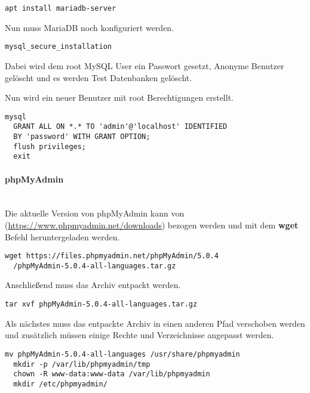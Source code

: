 \begin{lstlisting}[caption={MariadB installieren}, captionpos=b]
  apt install mariadb-server
\end{lstlisting}

Nun muss MariaDB noch konfiguriert werden.

\begin{lstlisting}[caption={MariaDB Secure Installation}, captionpos=b]
  mysql_secure_installation
\end{lstlisting}

Dabei wird dem root MySQL User ein Passwort gesetzt, Anonyme Benutzer gelöscht
und es werden Test Datenbanken gelöscht.

Nun wird ein neuer Benutzer mit root Berechtigungen erstellt.

\begin{lstlisting}[caption={MariaDB Secure Installation}, captionpos=b]
  mysql
  GRANT ALL ON *.* TO 'admin'@'localhost' IDENTIFIED 
  BY 'password' WITH GRANT OPTION;
  flush privileges;
  exit
\end{lstlisting}

\paragraph{phpMyAdmin}\mbox{}\\

Die aktuelle Version von phpMyAdmin kann von
(\url{https://www.phpmyadmin.net/downloads}) bezogen werden und mit dem
\textbf{wget} Befehl heruntergeladen werden.

\begin{lstlisting}[caption={phpMyAdmin Download}, captionpos=b]
  wget https://files.phpmyadmin.net/phpMyAdmin/5.0.4
  /phpMyAdmin-5.0.4-all-languages.tar.gz
\end{lstlisting}

Anschließend muss das Archiv entpackt werden.

\begin{lstlisting}[caption={phpMyAdmin Entpacken}, captionpos=b]
  tar xvf phpMyAdmin-5.0.4-all-languages.tar.gz
\end{lstlisting}

Als nächstes muss das entpackte Archiv in einen anderen Pfad verschoben werden
und zusätzlich müssen einige Rechte und Verzeichnisse angepasst werden.

\begin{lstlisting}[caption={phpMyAdmin Rechte und Verzeichnisse}, captionpos=b]
  mv phpMyAdmin-5.0.4-all-languages /usr/share/phpmyadmin
  mkdir -p /var/lib/phpmyadmin/tmp
  chown -R www-data:www-data /var/lib/phpmyadmin
  mkdir /etc/phpmyadmin/
\end{lstlisting}

